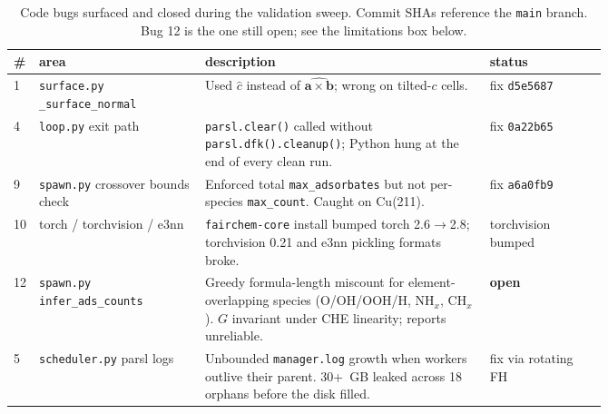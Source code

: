 \documentclass[11pt,letterpaper]{article}
\begin{document}
\begin{table}[H]
\centering\footnotesize
\sloppy
\begin{tabular}{@{}l p{0.28\linewidth} p{0.48\linewidth} l@{}}
\toprule
\# & area & description & status \\
\midrule
1  & \texttt{surface.py} \newline \texttt{\_surface\_normal} &
   Used $\hat c$ instead of $\widehat{\mathbf{a}\times\mathbf{b}}$;
   wrong on tilted-$c$ cells. &
   fix \texttt{d5e5687} \\
4  & \texttt{loop.py} exit path &
   \texttt{parsl.clear()} called without
   \texttt{parsl.dfk().cleanup()}; Python hung at the end of every
   clean run. &
   fix \texttt{0a22b65} \\
9  & \texttt{spawn.py} crossover bounds check &
   Enforced total \texttt{max\_adsorbates} but not per-species
   \texttt{max\_count}. Caught on Cu(211). &
   fix \texttt{a6a0fb9} \\
10 & torch / torchvision / e3nn &
   \texttt{fairchem-core} install bumped torch 2.6$\to$2.8; torchvision
   0.21 and e3nn pickling formats broke. &
   torchvision bumped \\
12 & \texttt{spawn.py} \newline \texttt{infer\_ads\_counts} &
   Greedy formula-length miscount for element-overlapping species
   (O/OH/OOH/H, NH$_x$, CH$_x$). $G$ invariant under CHE linearity;
   reports unreliable. &
   \textbf{open} \\
5 & \texttt{scheduler.py} parsl logs &
   Unbounded \texttt{manager.log} growth when workers outlive their
   parent. 30+~GB leaked across 18 orphans before the disk filled. &
   fix via rotating FH \\
\bottomrule
\end{tabular}
\caption{Code bugs surfaced and closed during the validation sweep.
Commit SHAs reference the \texttt{main} branch. Bug 12 is the one
still open; see the limitations box below.}
\label{tab:bugs}
\end{table}
\end{document}
